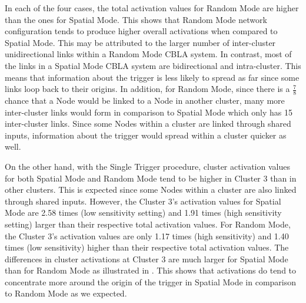 In each of the four cases, the total activation values for Random Mode are higher than the ones for Spatial Mode. This shows that Random Mode network configuration tends to produce higher overall activations when compared to Spatial Mode. This may be attributed to the larger number of inter-cluster unidirectional links within a Random Mode CBLA system. In contrast, most of the links in a Spatial Mode CBLA system are bidirectional and intra-cluster. This means that information about the trigger is less likely to spread as far since some links loop back to their origins. In addition, for Random Mode, since there is a $\frac{7}{8}$ chance that a Node would be linked to a Node in another cluster, many more inter-cluster links would form in comparison to Spatial Mode which only has 15 inter-cluster links. Since some Nodes within a cluster are linked through shared inputs, information about the trigger would spread within a cluster quicker as well. 

On the other hand, with the Single Trigger procedure, cluster activation values for both Spatial Mode and Random Mode tend to be higher in Cluster 3 than in other clusters. This is expected since some Nodes within a cluster are also linked through shared inputs. However, the Cluster 3's activation values for Spatial Mode are 2.58 times (low sensitivity setting) and 1.91 times (high sensitivity setting) larger than their respective total activation values. For Random Mode, the Cluster 3's activation values are only 1.17 times (high sensitivity) and 1.40 times (low sensitivity) higher than their respective total activation values. The differences in cluster activations at Cluster 3 are much larger for Spatial Mode than for Random Mode as illustrated in . This shows that activations do tend to concentrate more around the origin of the trigger in Spatial Mode in comparison to Random Mode as we expected. 

